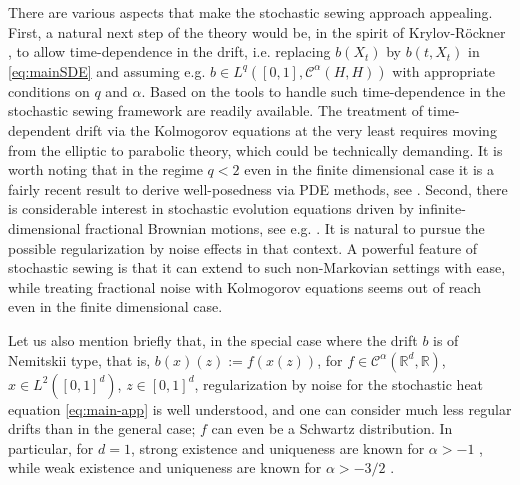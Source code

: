 \documentclass[11pt,a4paper]{article}
\newcommand{\C}{\mathcal{C}}
\newcommand{\cC}{\mathcal{C}}
\newcommand{\R}{\mathbb{R}}
\numberwithin{equation}{section}
\theoremstyle{definition}
\theoremstyle{remark}
\theoremstyle{plain}
\begin{document}
There are various aspects that make the stochastic sewing approach appealing. First, a natural next step of the theory would be, in the spirit of Krylov-R\"ockner \cite{KrylovRoeckner}, to allow time-dependence in the drift, i.e. replacing $b(X_t)$ by $b(t,X_t)$ in \eqref{eq:mainSDE} and assuming e.g. $b\in L^q([0,1],\cC^\alpha(H,H))$ with appropriate conditions on $q$ and $\alpha$.
Based on \cite{GaleatiGerencser,butkovskygallay}
the tools to handle such time-dependence in the stochastic sewing framework are readily available.
The treatment of time-dependent drift via the Kolmogorov equations at the very least requires moving from the elliptic to parabolic theory, which could be technically demanding. It is worth noting that in the regime $q<2$ even in the finite dimensional case it is a fairly recent result to derive well-posedness via PDE methods, see \cite{HuWeiYuan}.
Second, there is considerable interest in stochastic evolution equations driven by infinite-dimensional fractional Brownian motions, see e.g. \cite{DuncanMaslowski,MaslowskiNualart,TindelTudorViens, HuNualart,CoupekMaslowski}.
It is natural to pursue the possible regularization by noise effects in that context. A powerful feature of stochastic sewing is that it can extend to such non-Markovian settings with ease, while treating fractional noise with Kolmogorov equations seems out of reach even in the finite dimensional case.


Let us also mention briefly that, in the special case where the drift $b$ is of Nemitskii type, that is,
$b(x)(z):=f(x(z))$, for $f\in\C^\alpha(\R^d,\R)$, $x\in L^2([0,1]^d)$, $z\in[0,1]^d$, regularization by noise for the stochastic heat equation \eqref{eq:main-app} is well understood, and one can consider much less regular drifts than in the general case; $f$ can even be a Schwartz distribution. In particular, for $d=1$, strong existence and uniqueness are known for $\alpha > -1$ \cite{ABLM,D24}, while weak existence and uniqueness are known for $\alpha > -3/2$ \cite{BM24}.
\end{document}
